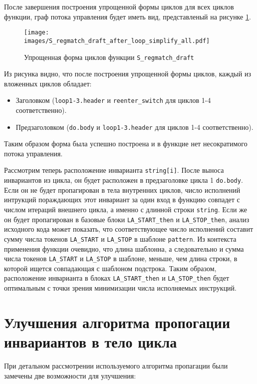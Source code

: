 После завершения построения упрощенной формы циклов для всех циклов функции, граф потока управления будет иметь вид, представленый на рисунке \ref{fig:S_regmatch_darft_loop_simplify_all}.

\begin{figure}
    \centering
    \texttt{[image: images/S\_regmatch\_draft\_after\_loop\_simplify\_all.pdf]}
    \caption{Упрощенная форма циклов функции \texttt{S\_regmatch\_draft}}
    \label{fig:S_regmatch_darft_loop_simplify_all}
\end{figure}

Из рисунка видно, что после построения упрощенной формы циклов, каждый из вложенных циклов обладает:
\begin{itemize}
    \item Заголовком (\texttt{loop1-3.header} и \texttt{reenter\_switch} для циклов 1-4 соответственно).
    \item Предзаголовком (\texttt{do.body} и \texttt{loop1-3.header} для циклов 1-4 соответственно).
\end{itemize}
Таким образом форма была успешно построена и в функцие нет несократимого потока управления.

Рассмотрим теперь расположение инварианта \texttt{string[i]}.
После выноса инвариантов из цикла, он будет расположен в предзаголовке цикла 1 \texttt{do.body}.
Если он не будет пропагирован в тела внутренних циклов, число исполнений интрукций пораждающих этот инвариант за один вход в функцию совпадет с числом итераций внешнего цикла, а именно с длинной строки \texttt{string}.
Если же он будет пропагирован в базовые блоки \texttt{LA\_START\_then} и \texttt{LA\_STOP\_then}, анализ исходного кода может показать, что соответствующее число исполнений составит сумму числа токенов \texttt{LA\_START} и \texttt{LA\_STOP} в шаблоне \texttt{pattern}.
Из контекста применения функции очевидно, что длина шаблонна, а следовательно и сумма числа токенов \texttt{LA\_START} и \texttt{LA\_STOP} в шаблоне, меньше, чем длина строки, в которой ищется совпадающая с шаблоном подстрока.
Таким образом, расположение инварианта в блоках \texttt{LA\_START\_then} и \texttt{LA\_STOP\_then} будет оптимальным с точки зрения минимизации числа исполняемых инструкций.

\section{Улучшения алгоритма пропогации инвариантов в тело цикла}

При детальном рассмотрении используемого алгоритма пропагации были замечены две возможности для улучшения:

